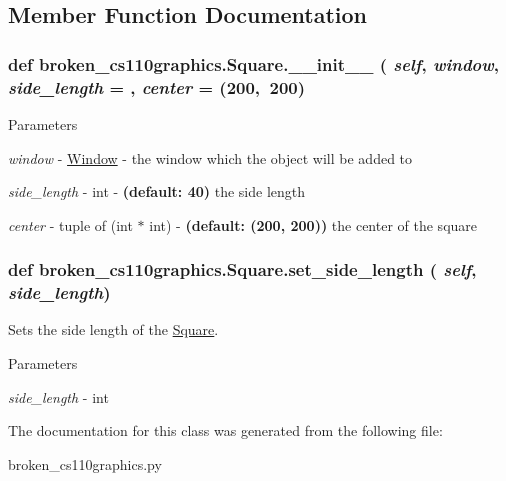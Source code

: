 \subsection{Member Function Documentation}
\hypertarget{classbroken__cs110graphics_1_1Square_a5225b2da51147ae4f531ee753b304194}{
\subsubsection[{\_\-\_\-init\_\-\_\-}]{\setlength{\rightskip}{0pt plus 5cm}def broken\_\-cs110graphics.Square.\_\-\_\-init\_\-\_\- ( {\em self}, \/   {\em window}, \/   {\em side\_\-length} = {}, \/   {\em center} = {\ttfamily (200,~200})}}
\label{classbroken__cs110graphics_1_1Square_a5225b2da51147ae4f531ee753b304194}

\begin{DoxyParams}{Parameters}
\item[{\em window}]-\/ \hyperlink{classbroken__cs110graphics_1_1Window}{Window} -\/ the window which the object will be added to \item[{\em side\_\-length}]-\/ int -\/ {\bfseries (default: 40)} the side length \item[{\em center}]-\/ tuple of (int $\ast$ int) -\/ {\bfseries (default: (200, 200))} the center of the square \end{DoxyParams}
\hypertarget{classbroken__cs110graphics_1_1Square_a773a0cd8c4ecb0c2089fb18840b3525e}{
\subsubsection[{set\_\-side\_\-length}]{\setlength{\rightskip}{0pt plus 5cm}def broken\_\-cs110graphics.Square.set\_\-side\_\-length ( {\em self}, \/   {\em side\_\-length})}}
\label{classbroken__cs110graphics_1_1Square_a773a0cd8c4ecb0c2089fb18840b3525e}


Sets the side length of the \hyperlink{classbroken__cs110graphics_1_1Square}{Square}. 
\begin{DoxyParams}{Parameters}
\item[{\em side\_\-length}]-\/ int \end{DoxyParams}


The documentation for this class was generated from the following file:\begin{DoxyCompactItemize}
\item 
broken\_\-cs110graphics.py\end{DoxyCompactItemize}
